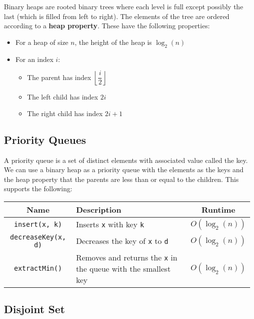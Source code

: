 \documentclass[a4paper, 12pt, twoside]{article}
\begin{document}
Binary heaps are rooted binary trees where each level is full except
possibly the last (which is filled from left to right). The
elements of the tree are ordered according to a 
\textbf{heap property}. These have the following properties: \begin{itemize}
  \item For a heap of size $n$, the height of the heap is $\log_2(n)$
  \item For an index $i$: \begin{itemize}
    \item The parent has index $\left\lfloor \dfrac{i}{2} \right\rfloor$
    \item The left child has index $2i$
    \item The right child has index $2i + 1$
  \end{itemize}
\end{itemize}

\newpage

\subsection{Priority Queues}

A priority queue is a set of distinct elements with associated value
called the key. We can use a binary heap as a priority queue with the
elements as the keys and the heap property that the parents are
less than or equal to the children. This supports the following:
\begin{center}
  \begin{tabular}{ || c | p{7.5cm} | c || }
    \hline
    Name & Description & Runtime \\
    \hline
    \texttt{insert(x, k)} & Inserts \texttt{x} with key \texttt{k}
    & $O(\log_2(n))$ \\
    \hline
    \texttt{decreaseKey(x, d)} & Decreases the key of \texttt{x} to \texttt{d}
    & $O(\log_2(n))$ \\
    \hline
    \texttt{extractMin()} & Removes and returns the \texttt{x} in the queue
    with the smallest key & $O(\log_2(n))$ \\
    \hline
  \end{tabular}
\end{center}

\subsection{Disjoint Set}
\end{document}
